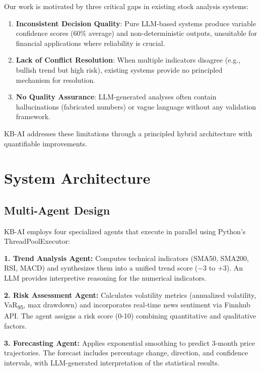 \documentclass[11pt,letterpaper]{article}
\begin{document}
Our work is motivated by three critical gaps in existing stock analysis systems:

\begin{enumerate}
    \item \textbf{Inconsistent Decision Quality}: Pure LLM-based systems produce variable confidence scores (60\% average) and non-deterministic outputs, unsuitable for financial applications where reliability is crucial.
    
    \item \textbf{Lack of Conflict Resolution}: When multiple indicators disagree (e.g., bullish trend but high risk), existing systems provide no principled mechanism for resolution.
    
    \item \textbf{No Quality Assurance}: LLM-generated analyses often contain hallucinations (fabricated numbers) or vague language without any validation framework.
\end{enumerate}

KB-AI addresses these limitations through a principled hybrid architecture with quantifiable improvements.

\section{System Architecture}

\subsection{Multi-Agent Design}

KB-AI employs four specialized agents that execute in parallel using Python's ThreadPoolExecutor:

\textbf{1. Trend Analysis Agent:} Computes technical indicators (SMA50, SMA200, RSI, MACD) and synthesizes them into a unified trend score ($-3$ to $+3$). An LLM provides interpretive reasoning for the numerical indicators.

\textbf{2. Risk Assessment Agent:} Calculates volatility metrics (annualized volatility, VaR\textsubscript{95}, max drawdown) and incorporates real-time news sentiment via Finnhub API. The agent assigns a risk score (0-10) combining quantitative and qualitative factors.

\textbf{3. Forecasting Agent:} Applies exponential smoothing to predict 3-month price trajectories. The forecast includes percentage change, direction, and confidence intervals, with LLM-generated interpretation of the statistical results.
\end{document}
